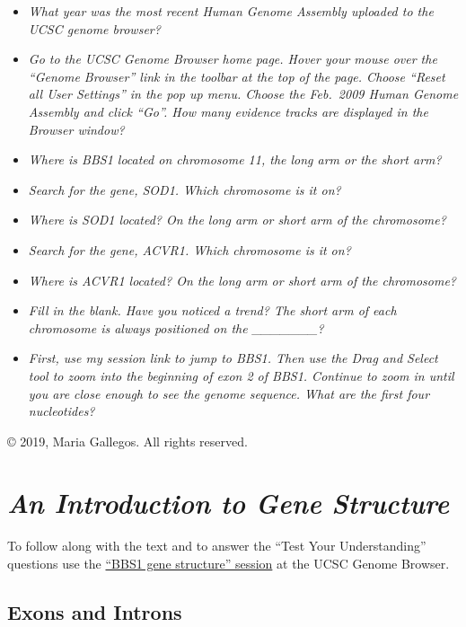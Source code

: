 \documentclass[
]{book}
\providecommand{\tightlist}{%
  \setlength{\itemsep}{0pt}\setlength{\parskip}{0pt}}
\begin{document}
\begin{itemize}
\tightlist
\item
  \emph{What year was the most recent Human Genome Assembly uploaded to the UCSC genome browser?}
\item
  \emph{Go to the UCSC Genome Browser home page. Hover your mouse over the ``Genome Browser'' link in the toolbar at the top of the page. Choose ``Reset all User Settings'' in the pop up menu. Choose the Feb.~2009 Human Genome Assembly and click ``Go''. How many evidence tracks are displayed in the Browser window?}
\item
  \emph{Where is BBS1 located on chromosome 11, the long arm or the short arm?}
\item
  \emph{Search for the gene, SOD1. Which chromosome is it on?}
\item
  \emph{Where is SOD1 located? On the long arm or short arm of the chromosome?}
\item
  \emph{Search for the gene, ACVR1. Which chromosome is it on?}
\item
  \emph{Where is ACVR1 located? On the long arm or short arm of the chromosome?}
\item
  \emph{Fill in the blank. Have you noticed a trend? The short arm of each chromosome is always positioned on the \_\_\_\_\_\_\_?}
\item
  \emph{First, use my session link to jump to BBS1. Then use the Drag and Select tool to zoom into the beginning of exon 2 of BBS1. Continue to zoom in until you are close enough to see the genome sequence. What are the first four nucleotides?}
\end{itemize}

© 2019, Maria Gallegos. All rights reserved.

\hypertarget{an-introduction-to-gene-structure}{%
\chapter{\texorpdfstring{\emph{An Introduction to Gene Structure}}{An Introduction to Gene Structure}}\label{an-introduction-to-gene-structure}}

To follow along with the text and to answer the ``Test Your Understanding'' questions use the \href{https://genome.ucsc.edu/s/megallegos/Biol\%20310\%20Module\%201}{``BBS1 gene structure'' session} at the UCSC Genome Browser.

\hypertarget{exons-and-introns}{%
\section{Exons and Introns}\label{exons-and-introns}}
\end{document}
